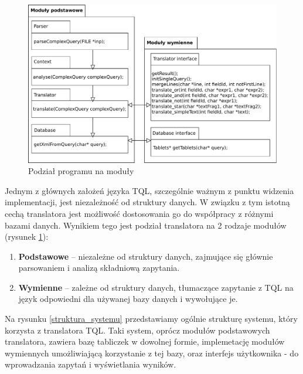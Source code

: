 \begin{figure}
 \centering
 \includegraphics[width=500px]{../diagramy/pakiety.pdf}
 \caption{Podział programu na moduły}
 \label{moduly}
\end{figure}
Jednym z głównych założeń języka TQL, szczególnie ważnym z punktu widzenia implementacji, jest niezależność od struktury danych.
W związku z tym istotną cechą translatora jest możliwość dostosowania  go do współpracy z różnymi bazami danych.
 Wynikiem tego jest podział translatora na 2 rodzaje modułów (rysunek \ref{moduly}):
\begin{enumerate}
 \item \textbf{Podstawowe} -- niezależne od struktury danych, zajmujące się głównie parsowaniem i analizą składniową zapytania.
 \item \textbf{Wymienne} -- zależne od struktury danych, tłumaczące zapytanie z TQL na język odpowiedni dla używanej bazy danych
i wywołujące je.
\end{enumerate}
Na rysunku \ref{struktura_systemu} przedstawiamy ogólnie strukturę systemu, który korzysta z translatora TQL. Taki system, oprócz modułów podstawowych translatora, zawiera bazę tabliczek w dowolnej formie, implemetację modułów wymiennych umożliwiającą korzystanie z tej bazy, oraz interfejs użytkownika - do wprowadzania zapytań i wyświetlania wyników. \\


